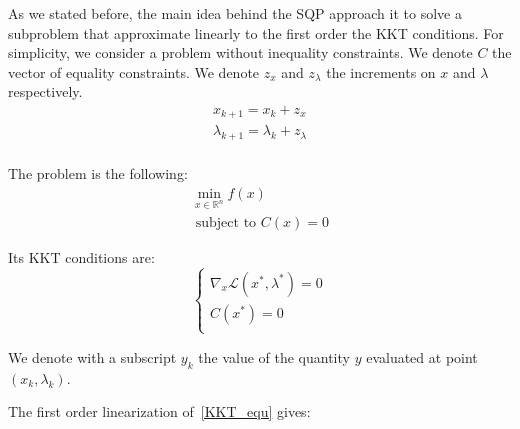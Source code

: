 As we stated before, the main idea behind the SQP approach it to solve a subproblem that approximate linearly to the first order the KKT conditions.
For simplicity, we consider a problem without inequality constraints.
We denote $C$ the vector of equality constraints.
We denote $z_x$ and $z_\lambda$ the increments on $x$ and $\lambda$ respectively.
\begin{equation}
  \begin{array}{l}
    x_{k+1} = x_k + z_x\\
    \lambda_{k+1} = \lambda_k+z_\lambda\\
  \end{array}
\end{equation}

The problem is the following:
\begin{equation}
  \begin{array}{l}
    \min\limits_{x\in\mathbb{R}^n}{f(x)} \\
    \text{ subject to } C(x) = 0
  \end{array}
\end{equation}

Its KKT conditions are:
\begin{equation}
  \label{KKT_equ}
  \left\{
\begin{array}{ll}
  \nabla_x\mathcal{L}(x^*,\lambda^*) = 0\\
  C(x^*) = 0\\
\end{array}
\right.
\end{equation}

We denote with a subscript $y_k$ the value of the quantity $y$ evaluated at point $(x_k, \lambda_k)$.

The first order linearization of~\ref{KKT_equ} gives:

